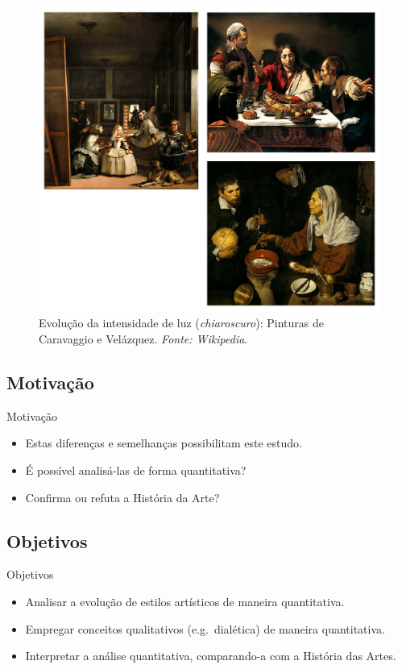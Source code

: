 \documentclass{beamer}
\begin{document}
\begin{frame}

\begin{figure}
\begin{center}
    \includegraphics[height=0.55\textwidth]{figs/fig_car_vel.png}
  \end{center}
  \caption{Evolução da intensidade de luz (\textit{chiaroscuro}): Pinturas de Caravaggio e Velázquez. \textit{Fonte: Wikipedia}.}
  \label{fig:carvel}
\end{figure}

\end{frame}

\subsection{Motivação}
\begin{frame}{Motivação}
\begin{itemize}
  \item Estas diferenças e semelhanças possibilitam este estudo.
  \item É possível analisá-las de forma quantitativa?
  \item Confirma ou refuta a História da Arte?
\end{itemize}

\end{frame}

\subsection{Objetivos}
\begin{frame}{Objetivos}
\begin{itemize}
  \item Analisar a evolução de estilos artísticos de maneira quantitativa.
  \pause
  \item Empregar conceitos qualitativos (e.g.\ dialética) de maneira quantitativa.
  \pause
  \item Interpretar a análise quantitativa, comparando-a com a História das Artes.
\end{itemize}

\end{frame}
\end{document}
